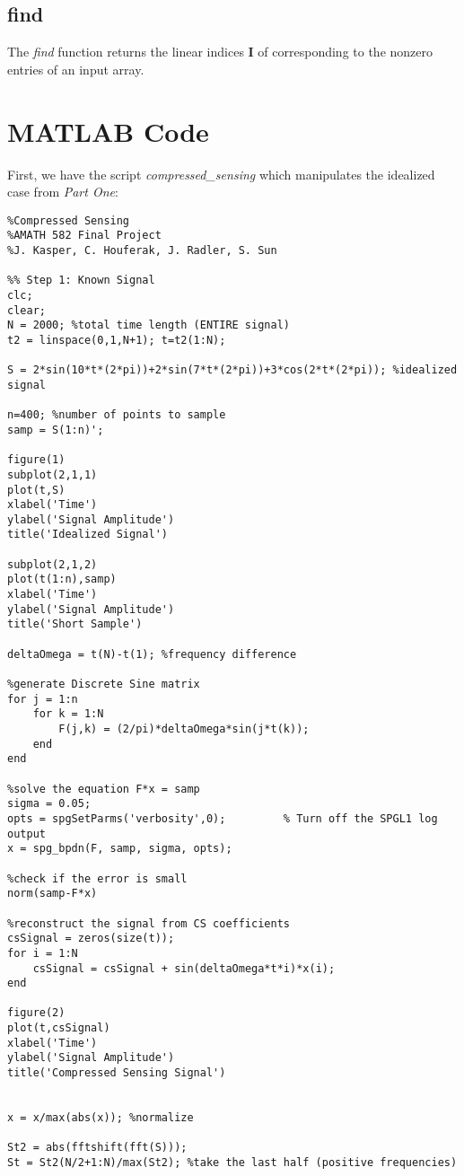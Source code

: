 \documentclass[11pt]{article}
\begin{document}
\begin{appendices}
\subsection*{find}
The \emph{find} function returns the linear indices $\mathbf{I}$ of corresponding to the nonzero entries of an input array. 

\pagebreak

\section{MATLAB Code}
First, we have the script \emph{compressed\_sensing} which manipulates the idealized case from \emph{Part One}:\\
\begin{verbatim}
%Compressed Sensing
%AMATH 582 Final Project
%J. Kasper, C. Houferak, J. Radler, S. Sun

%% Step 1: Known Signal
clc;
clear;
N = 2000; %total time length (ENTIRE signal)
t2 = linspace(0,1,N+1); t=t2(1:N);

S = 2*sin(10*t*(2*pi))+2*sin(7*t*(2*pi))+3*cos(2*t*(2*pi)); %idealized signal

n=400; %number of points to sample
samp = S(1:n)';

figure(1)
subplot(2,1,1)
plot(t,S)
xlabel('Time')
ylabel('Signal Amplitude')
title('Idealized Signal')

subplot(2,1,2)
plot(t(1:n),samp)
xlabel('Time')
ylabel('Signal Amplitude')
title('Short Sample')

deltaOmega = t(N)-t(1); %frequency difference

%generate Discrete Sine matrix
for j = 1:n
    for k = 1:N
        F(j,k) = (2/pi)*deltaOmega*sin(j*t(k));
    end
end

%solve the equation F*x = samp
sigma = 0.05;
opts = spgSetParms('verbosity',0);         % Turn off the SPGL1 log output
x = spg_bpdn(F, samp, sigma, opts);

%check if the error is small
norm(samp-F*x)

%reconstruct the signal from CS coefficients
csSignal = zeros(size(t));
for i = 1:N
    csSignal = csSignal + sin(deltaOmega*t*i)*x(i);
end

figure(2)
plot(t,csSignal)
xlabel('Time')
ylabel('Signal Amplitude')
title('Compressed Sensing Signal')


x = x/max(abs(x)); %normalize

St2 = abs(fftshift(fft(S)));
St = St2(N/2+1:N)/max(St2); %take the last half (positive frequencies)


\end{verbatim}
\end{appendices}
\end{document}
